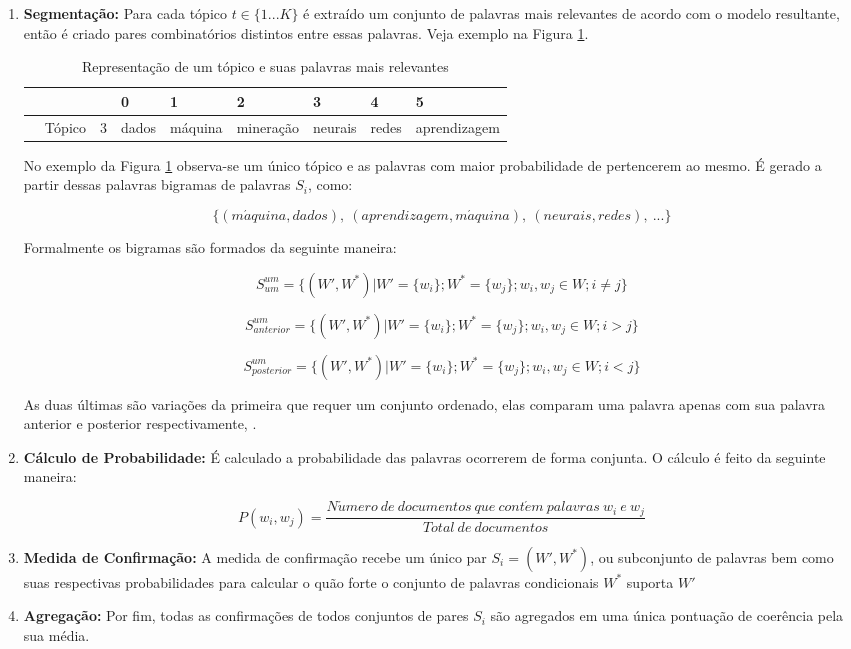 \documentclass[12pt,a4paper]{article}
\begin{document}
\begin{enumerate}
\item \textbf{Segmentação:} Para cada tópico $t \in \{1 ... K\}$ é extraído um conjunto de palavras mais relevantes de acordo com o modelo resultante,
 então é criado pares combinatórios distintos entre essas palavras. Veja exemplo na Figura \ref{fig-exe}.

\begin{table}[h]
  \centering
  \begin{tabular}{l l l l l l l l l}
  & & &0 &1 &2 &3 &4 &5 \\
  \hline
  &Tópico &3 &dados &máquina &mineração &neurais &redes &aprendizagem \\
  \hline
  \end{tabular}
  \caption{Representação de um tópico e suas palavras mais relevantes}
  \label{fig-exe}
\end{table}

No exemplo da Figura \ref{fig-exe} observa-se um único tópico e as palavras com maior probabilidade de pertencerem ao mesmo. É gerado a partir dessas palavras bigramas de palavras $S_i$, como:

\[\{(m\acute{a}quina, dados),\ (aprendizagem, m\acute{a}quina),\ (neurais, redes),\ ...\}\]

Formalmente os bigramas são formados da seguinte maneira:

\begin{equation}
S_{um}^{um} = \{(W',W^*)|W' = \{w_i\};
W^* =  \{w_j\};w_i,w_j \in W; i \neq j\}
\end{equation}

\begin{equation}
S_{anterior}^{um} = \{(W',W^*)|W' = \{w_i\};
W^* =  \{w_j\};w_i,w_j \in W; i > j\}
\end{equation}

\begin{equation}
S_{posterior}^{um} = \{(W',W^*)|W' = \{w_i\};
W^* =  \{w_j\};w_i,w_j \in W; i < j\}
\end{equation}

As duas últimas são variações da primeira que requer um conjunto ordenado, elas comparam uma palavra apenas com sua palavra anterior e posterior respectivamente, \cite{roder2015exploring}.

\item \textbf{Cálculo de Probabilidade:} É calculado a probabilidade das palavras ocorrerem de forma conjunta. O cálculo é feito da seguinte maneira:

\[P(w_i,w_j) = \frac{N\acute{u}mero\ de\ documentos\ que\ cont\acute{e}m\ palavras\ w_i\ e\ w_j}{Total\ de\ documentos}\]

\item \textbf{Medida de Confirmação:} A medida de confirmação recebe um único par $S_i = (W',W^*)$, ou subconjunto de palavras bem como suas respectivas probabilidades
 para calcular o quão forte o conjunto de palavras condicionais $W^*$ suporta $W'$

\item \textbf{Agregação:} Por fim, todas as confirmações de todos conjuntos de pares $S_i$ são agregados em uma única pontuação de coerência pela sua média.
\end{enumerate}
\end{document}
